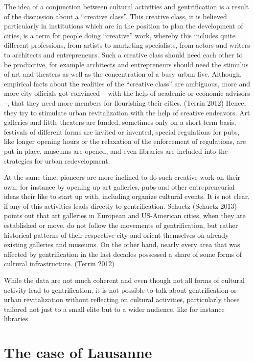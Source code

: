 \documentclass[a4paper,
fontsize=11pt,
oneside,
numbers=noperiodatend,
parskip=half-,
bibliography=totoc,
final
]{scrartcl}
\begin{document}
The idea of a conjunction between cultural activities and gentrification
is a result of the discussion about a \enquote{creative class}. This
creative class, it is believed particularly in institutions which are in
the position to plan the development of cities, is a term for people
doing \enquote{creative} work, whereby this includes quite different
professions, from artists to marketing specialists, from actors and
writers to architects and entrepreneurs. Such a creative class should
need each other to be productive, for example architects and
entrepreneurs should need the stimulus of art and theaters as well as
the concentration of a busy urban live. Although, empirical facts about
the realities of the \enquote{creative class} are ambiguous, more and
more city officials got convinced -- with the help of academic or
economic advisors --, that they need more members for flourishing their
cities. (Terrin 2012) Hence, they try to stimulate urban revitalization
with the help of creative endeavors. Art galleries and little theaters
are funded, sometimes only on a short term basis, festivals of different
forms are invited or invented, special regulations for pubs, like longer
opening hours or the relaxation of the enforcement of regulations, are
put in place, museums are opened, and even libraries are included into
the strategies for urban redevelopment.

At the same time, pioneers are more inclined to do such creative work on
their own, for instance by opening up art galleries, pubs and other
entrepreneurial ideas their like to start up with, including organize
cultural events. It is not clear, if any of this activities leads
directly to gentrification. Schuetz (Schuetz 2013) points out that art
galleries in European and US-American cities, when they are established
or move, do not follow the movements of gentrification, but rather
historical patterns of their respective city and orient themselves on
already existing galleries and museums. On the other hand, nearly every
area that was affected by gentrification in the last decades possessed a
share of some forms of cultural infrastructure. (Terrin 2012)

While the data are not much coherent and even though not all forms of
cultural activity lead to gentrification, it is not possible to talk
about gentrification or urban revitalization without reflecting on
cultural activities, particularly those tailored not just to a small
elite but to a wider audience, like for instance libraries.

\section{The case of Lausanne}\label{the-case-of-lausanne}
\end{document}
